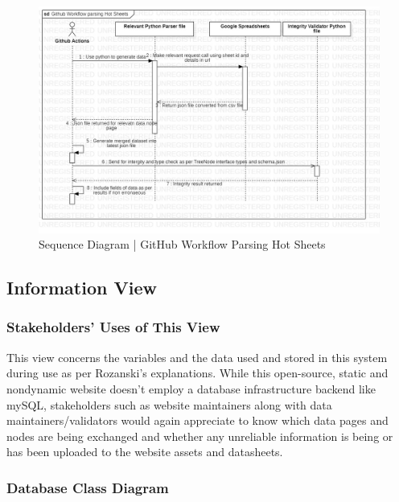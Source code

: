 \begin{figure}[H]
  \centering
  \includegraphics[width=\linewidth]{img/sequence-diagram-3.jpg}
  \caption{Sequence Diagram | GitHub Workflow Parsing Hot Sheets}
\end{figure}

\subsection{Information View}

\subsubsection{Stakeholders' Uses of This View}

This view concerns the variables and the data used and stored in this system during use as per Rozanski's explanations. While this open-source, static and nondynamic website doesn't employ a database infrastructure backend like mySQL, stakeholders such as website maintainers along with data maintainers/validators would again appreciate to know which data pages and nodes are being exchanged and whether any unreliable information is being or has been uploaded to the website assets and datasheets.

\subsubsection{Database Class Diagram}

